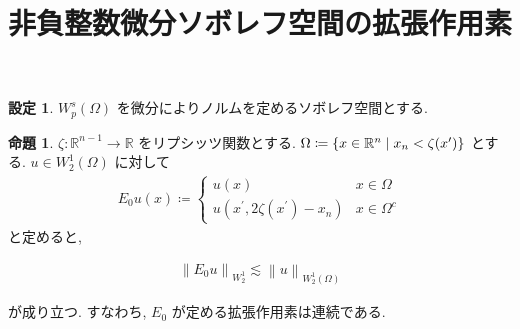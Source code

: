 \documentclass[10pt, fleqn, label-section=none]{bxjsarticle}
\title{非負整数微分ソボレフ空間の拡張作用素}
\date{}
\author{}
\theoremstyle{definition}
\newtheorem{prop}[dfn]{命題}
\newtheorem{setting}[dfn]{設定}
\newcommand{\cbra}[1]{\mleft\{#1\mright\}}
\newcommand{\norm}[1]{\left\|#1\right\|}
\renewcommand{\;}{\, ; \,}
\begin{document}
\maketitle

\section{}

\begin{setting}$W^s_p(\Omega)$ を微分によりノルムを定めるソボレフ空間とする. 

\end{setting}

\begin{prop}$\zeta : \mathbb R^{n-1} \rightarrow \mathbb R$ をリプシッツ関数とする. $\Omega \coloneqq \cbra{x \in \mathbb R^n \mid x_n < \zeta(x^\prime )}$ とする. $u \in W^1_2(\Omega)$ に対して
\begin{align*} E_0u(x) \coloneqq \begin{cases} u(x) & x \in \Omega \\ u(x^\prime, 2 \zeta (x^\prime ) - x_n) & x \in \Omega^c \end{cases} \end{align*}
と定めると, 

\begin{align*} \norm{E_0 u}_{W^1_2} \lesssim \norm{u}_{W_2^1(\Omega )} \end{align*}

が成り立つ. すなわち, $E_0$ が定める拡張作用素は連続である. 

\end{prop}
\end{document}
